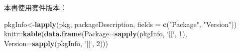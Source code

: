 \documentclass[]{book}
\newenvironment{Shaded}{\begin{snugshade}}{\end{snugshade}}
\newcommand{\KeywordTok}[1]{\textcolor[rgb]{0.13,0.29,0.53}{\textbf{{#1}}}}
\newcommand{\DataTypeTok}[1]{\textcolor[rgb]{0.13,0.29,0.53}{{#1}}}
\newcommand{\DecValTok}[1]{\textcolor[rgb]{0.00,0.00,0.81}{{#1}}}
\newcommand{\StringTok}[1]{\textcolor[rgb]{0.31,0.60,0.02}{{#1}}}
\newcommand{\NormalTok}[1]{{#1}}
\theoremstyle{definition}
\theoremstyle{definition}
\theoremstyle{remark}
\begin{document}
本書使用套件版本：

\begin{Shaded}
\begin{Highlighting}[]
\NormalTok{pkgInfo<-}\KeywordTok{lapply}\NormalTok{(pkg, packageDescription, }\DataTypeTok{fields =} \KeywordTok{c}\NormalTok{(}\StringTok{"Package"}\NormalTok{, }\StringTok{"Version"}\NormalTok{))}
\NormalTok{knitr::}\KeywordTok{kable}\NormalTok{(}\KeywordTok{data.frame}\NormalTok{(}\DataTypeTok{Package=}\KeywordTok{sapply}\NormalTok{(pkgInfo, }\StringTok{`}\DataTypeTok{[[}\StringTok{`}\NormalTok{, }\DecValTok{1}\NormalTok{),}
  \DataTypeTok{Version=}\KeywordTok{sapply}\NormalTok{(pkgInfo, }\StringTok{`}\DataTypeTok{[[}\StringTok{`}\NormalTok{, }\DecValTok{2}\NormalTok{)))}
\end{Highlighting}
\end{Shaded}
\end{document}
